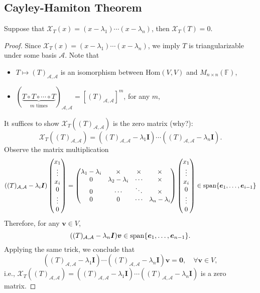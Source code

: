 \subsection{Cayley-Hamiton Theorem}
\begin{proposition}\label{pro:8:1}
Suppose that $\mathcal{X}_T(x)=(x-\lambda_1)\cdots(x-\lambda_n)$, then $\mathcal{X}_T(T)=0$.
\end{proposition}
\begin{proof}
Since $\mathcal{X}_T(x)=(x-\lambda_1)\cdots(x-\lambda_n)$, we imply $T$ is triangularizable under some basis $\mathcal{A}$.
Note that
\begin{itemize}
\item
$T\mapsto(T)_{\mathcal{A},\mathcal{A}}$ is an isomorphism between $\text{Hom}(V,V)$ and $M_{n\times n}(\mathbb{F})$,
\item
$(\underbrace{T\circ T\circ\cdots\circ T}_{\text{$m$ times}})_{\mathcal{A},\mathcal{A}} = [(T)_{\mathcal{A},\mathcal{A}}]^m$, for any $m$,
\end{itemize}
It suffices to show $\mathcal{X}_T((T)_{\mathcal{A},\mathcal{A}})$ is the zero matrix (why?):
\[
\mathcal{X}_T((T)_{\mathcal{A},\mathcal{A}})=
((T)_{\mathcal{A},\mathcal{A}}-\lambda_1\bm I)\cdots
((T)_{\mathcal{A},\mathcal{A}}-\lambda_n\bm I).
\]
Observe the matrix multiplication
\[
((T)_{\mathcal{A},\mathcal{A}}-\lambda_i\bm I)\begin{pmatrix}
x_1\\\vdots\\x_i\\0\\\vdots\\0
\end{pmatrix}
=
\begin{pmatrix}
\lambda_1-\lambda_i&\times&\times&\times\\
0&\lambda_2-\lambda_i&\cdots&\times\\
0&\cdots&\ddots&\times\\
0&0&\cdots&\lambda_n-\lambda_i
\end{pmatrix}
\begin{pmatrix}
x_1\\\vdots\\x_i\\0\\\vdots\\0
\end{pmatrix}
\in\operatorname{span}\{\bm e_1,\dots,\bm e_{i-1}\}
\]
Therefore, for any $\bm v\in V$,
\[
((T)_{\mathcal{A},\mathcal{A}}-\lambda_n\bm I)\bm v\in\operatorname{span}\{\bm e_1,\dots,\bm e_{n-1}\}.
\]
Applying the same trick, we conclude that 
\[
((T)_{\mathcal{A},\mathcal{A}}-\lambda_1\bm I)\cdots
((T)_{\mathcal{A},\mathcal{A}}-\lambda_n\bm I)\bm v
=\bm0,\quad\forall \bm v\in V,
\]
i.e., $\mathcal{X}_T((T)_{\mathcal{A},\mathcal{A}})=((T)_{\mathcal{A},\mathcal{A}}-\lambda_1\bm I)\cdots
((T)_{\mathcal{A},\mathcal{A}}-\lambda_n\bm I)$ is a zero matrix.
\end{proof}

